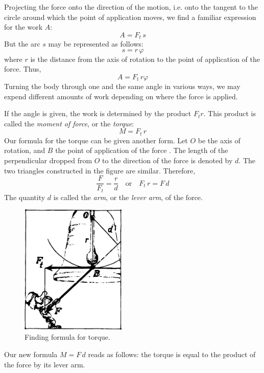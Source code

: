 Projecting the force onto the direction of the motion, i.e. onto the tangent to the circle around which the point
of application moves, we find a familiar expression for the work $A$:
 \begin{equation*}%
A  = F_{t} \, s 
 \end{equation*}
But the arc $s$ may be represented as follows:
 \begin{equation*}%
s = r \, \varphi
 \end{equation*}
where $r$ is the distance from the axis of rotation to the
point of application of the force. Thus,
 \begin{equation*}%
A = F_{t} \, r \varphi
 \end{equation*}
Turning the body through one and the same angle in
various ways, we may expend different amounts of work
depending on where the force is applied.

If the angle is given, the work is determined by the
product $F_{t}r$. This product is called the \emph{moment of force}, or the \emph{torque}:
 \begin{equation*}%
M = F_{t} \, r 
 \end{equation*}
Our formula for the torque can be given another form.
Let $O$ be the axis of rotation, and $B$ the point of application of the force . The length of the perpendicular dropped from $O$ to the direction of the force is denoted by $d$. The two triangles constructed in the figure are similar. Therefore,
 \begin{equation*}%
\dfrac{F}{F_{t}} = \dfrac{r}{d}  \quad \textrm{or} \quad F_{t} \, r = F \, d
 \end{equation*}
The quantity $d$ is called the \emph{arm}, or the \emph{lever arm}, of the force.

 \begin{figure}[!ht]
 \centering
 \includegraphics[width=0.45\textwidth]{figures/fig-5-02.pdf}
 \caption{Finding formula for torque.}
 \label{fig-5-02}
 \end{figure}
Our new formula $M = F \, d$ reads as follows: the torque
is equal to the product of the force by its lever arm.

